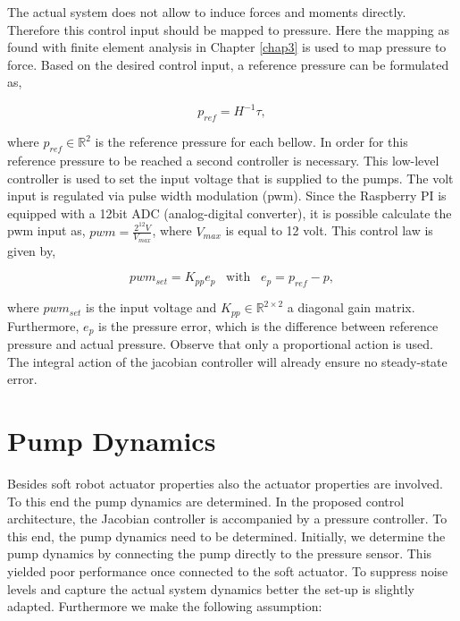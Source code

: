The actual system does not allow to induce forces and moments directly. Therefore this control input should be mapped to pressure. Here the mapping as found with finite element analysis in Chapter \ref{chap3} is used to map pressure to force. Based on the desired control input, a reference pressure can be formulated as,

\begin{equation}
    p_{ref} = H^{-1}\tau,
\end{equation}


where $p_{ref} \in \mathbb{R}^2$ is the reference pressure for each bellow. In order for this reference pressure to be reached a second controller is necessary. This low-level controller is used to set the input voltage that is supplied to the pumps.  The volt input is regulated via pulse width modulation (pwm). Since the Raspberry PI is equipped with a 12bit ADC (analog-digital converter), it is possible calculate the pwm input as, $\textit{pwm} = \frac{2^{12} V}{V_{max}} $, where $V_{max}$ is equal to 12 volt. This control law is given by,


\begin{equation}
    pwm_{set} = K_{pp}e_p \hspace{10pt} \text{with} \hspace{10pt} e_p = p_{ref} - p,
\end{equation}



where $pwm_{set}$ is the input voltage and $K_{pp} \in \mathbb{R}^{2\times 2}$ a diagonal gain matrix. Furthermore, $e_p$ is the pressure error, which is the difference between reference pressure and actual pressure. Observe that only a proportional action is used. The integral action of the jacobian controller will already ensure no steady-state error. 




\section{Pump Dynamics}





Besides soft robot actuator properties also the actuator properties are involved. To this end the pump dynamics are determined. In the proposed control architecture, the Jacobian controller is accompanied by a pressure controller. To this end, the pump dynamics need to be determined. Initially, we determine the pump dynamics by  connecting the pump directly to the pressure sensor. This yielded poor performance once connected to the soft actuator. To suppress noise levels and capture the actual system dynamics better the set-up is slightly adapted. Furthermore we make the following assumption:


